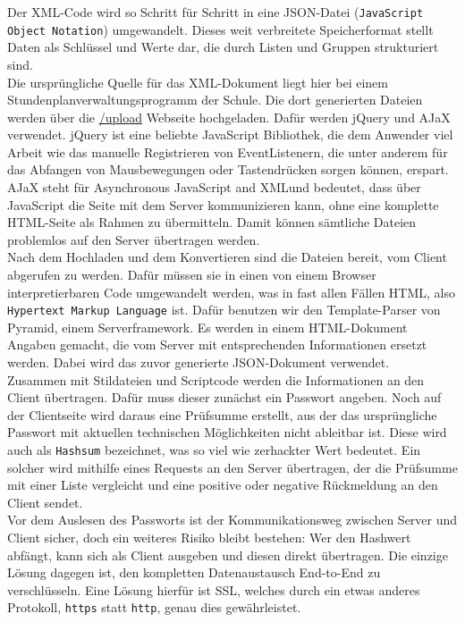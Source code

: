 Der XML-Code wird so Schritt für Schritt in eine JSON-Datei (\texttt{JavaScript Object Notation}) umgewandelt. Dieses weit verbreitete Speicherformat stellt Daten als Schlüssel und Werte dar, die durch Listen und Gruppen strukturiert sind.\\

Die ursprüngliche Quelle für das XML-Dokument liegt hier bei einem Stundenplanverwaltungsprogramm der Schule. Die dort generierten Dateien werden über die \url{/upload} Webseite hochgeladen. Dafür werden jQuery und AJaX verwendet. jQuery ist eine beliebte JavaScript Bibliothek, die dem Anwender viel Arbeit wie das manuelle Registrieren von EventListenern, die unter anderem für das Abfangen von Mausbewegungen oder Tastendrücken sorgen können, erspart. AJaX steht für \glqq Asynchronous JavaScript and XML\grqq und bedeutet, dass über JavaScript die Seite mit dem Server kommunizieren kann, ohne eine komplette HTML-Seite als Rahmen zu übermitteln. Damit können sämtliche Dateien problemlos auf den Server übertragen werden.\\

Nach dem Hochladen und dem Konvertieren sind die Dateien bereit, vom Client abgerufen zu werden. Dafür müssen sie in einen von einem Browser interpretierbaren Code umgewandelt werden, was in fast allen Fällen HTML, also \texttt{Hypertext Markup Language} ist. Dafür benutzen wir den Template-Parser von Pyramid, einem Serverframework. Es werden in einem HTML-Dokument Angaben gemacht, die vom Server mit entsprechenden Informationen ersetzt werden. Dabei wird das zuvor generierte JSON-Dokument verwendet.\\

Zusammen mit Stildateien und Scriptcode werden die Informationen an den Client übertragen. Dafür muss dieser zunächst ein Passwort angeben. Noch auf der Clientseite wird daraus eine Prüfsumme erstellt, aus der das ursprüngliche Passwort mit aktuellen technischen Möglichkeiten nicht ableitbar ist. Diese wird auch als \texttt{Hashsum} bezeichnet, was so viel wie \glqq zerhackter Wert \grqq bedeutet. Ein solcher wird mithilfe eines Requests an den Server übertragen, der die Prüfsumme mit einer Liste vergleicht und eine positive oder negative Rückmeldung an den Client sendet.\\

Vor dem Auslesen des Passworts ist der Kommunikationsweg zwischen Server und Client sicher, doch ein weiteres Risiko bleibt bestehen: Wer den Hashwert abfängt, kann sich als Client ausgeben und diesen direkt übertragen. Die einzige Lösung dagegen ist, den kompletten Datenaustausch End-to-End zu verschlüsseln. Eine Lösung hierfür ist SSL, welches durch ein etwas  anderes Protokoll, \texttt{https} statt \texttt{http}, genau dies gewährleistet.
